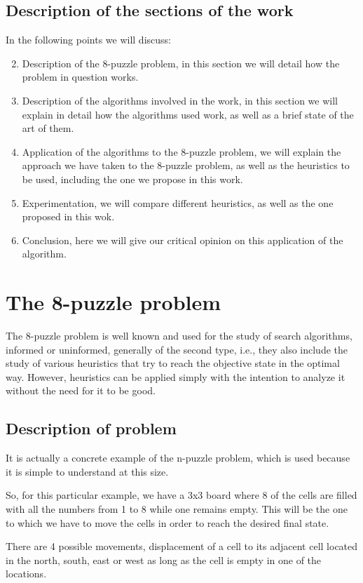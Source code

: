 \documentclass[runningheads]{llncs}
\begin{document}
\subsection{Description of the sections of the work}
In the following points we will discuss:
\begin{enumerate}
\setcounter{enumi}{1}
\item Description of the 8-puzzle problem, in this section we will detail how the problem in question works.
\item Description of the algorithms involved in the work, in this section we will explain in detail how the algorithms used work, as well as a brief state of the art of them.
\item Application of the algorithms to the 8-puzzle problem, we will explain the approach we have taken to the 8-puzzle problem, as well as the heuristics to be used, including the one we propose in this work.
\item Experimentation, we will compare different heuristics, as well as the one proposed in this wok.
\item Conclusion, here we will give our critical opinion on this application of the algorithm.
\end{enumerate}

\section{The 8-puzzle problem}
The 8-puzzle problem is well known and used for the study of search algorithms, informed or uninformed, 
generally of the second type, i.e., they also include the study of various heuristics that try to reach 
the objective state in the optimal way. However, heuristics can be applied simply with the intention to 
analyze it without the need for it to be good.

\subsection{Description of problem}
It is actually a concrete example of the n-puzzle problem, which is used because it is simple to understand 
at this size.

So, for this particular example, we have a 3x3 board where 8 of the cells are filled with all the numbers 
from 1 to 8 while one remains empty. This will be the one to which we have to move the cells in order to reach 
the desired final state.

There are 4 possible movements, displacement of a cell to its adjacent cell located in the north, south, east 
or west as long as the cell is empty in one of the locations.
\end{document}
